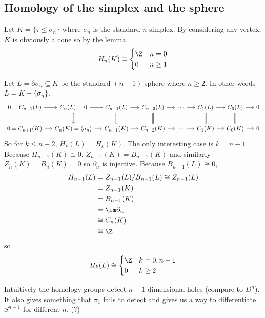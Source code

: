 \documentclass[a4paper]{article}
\renewcommand{\b}{\partial} %
\begin{document}
\subsection{Homology of the simplex and the sphere}

\begin{eg}
  Let \(K = \{\tau \leq \sigma_n\}\) where \(\sigma_n\) is the standard \(n\)-simplex. By considering any vertex, \(K\) is obviously a cone so by the lemma
  \[
    H_n(K) \cong
    \begin{cases}
      \Z & n = 0 \\
      0 & n \geq 1
    \end{cases}
  \]
\end{eg}

\begin{eg}
  Let \(L = \b \sigma_n \subseteq K\) be the standard \((n - 1)\)-sphere where \(n \geq 2\). In other words \(L = K - \{\sigma_n\}\).
  \[
    \begin{tikzcd}[column sep=small]
      0 = C_{n + 1}(L) \ar[r] & C_n(L) = 0 \ar[r] \ar[d, hook] & C_{n -1}(L) \ar[r] \ar[d, equal] & C_{n - 2}(L) \ar[r] \ar[d, equal] & \cdots \ar[r] & C_1(L) \ar[r] \ar[d, equal] & C_0(L) \ar[r] \ar[d, equal] & 0 \\
      0 = C_{n + 1}(K) \ar[r] & C_n(K) = \langle \sigma_n \rangle \ar[r] & C_{n - 1}(K) \ar[r] & C_{n - 2}(K) \ar[r] & \cdots \ar[r] & C_1(K) \ar[r] & C_0(K) \ar[r] & 0
    \end{tikzcd}
  \]
  So for \(k \leq n - 2\), \(H_k(L) = H_k(K)\). The only interesting case is \(k = n - 1\). Because \(H_{n - 1}(K) \cong 0\), \(Z_{n - 1}(K) = B_{n - 1}(K)\) and similarly \(Z_n(K) = B_n(K) = 0\) so \(\b_n\) is injective. Because \(B_{n - 1}(L) \cong 0\),
  \begin{align*}
    H_{n - 1}(L)
    &= Z_{n - 1}(L) /B_{n - 1}(L) \cong Z_{n - 1}(L) \\
    &= Z_{n - 1}(K) \\
    &= B_{n - 1}(K) \\
    &= \im \b_n \\
    &\cong C_n(K) \\
    &\cong \Z
  \end{align*}
  so
  \[
    H_k(L) \cong
    \begin{cases}
      \Z & k = 0, n - 1 \\
      0 & k \geq 2
    \end{cases}
  \]
\end{eg}

Intuitively the homology groups detect \(n - 1\)-dimensional holes (compare to \(D^n\)). It also gives something that \(\pi_1\) fails to detect and gives us a way to differentiate \(S^{n - 1}\) for different \(n\). (?)
\end{document}

